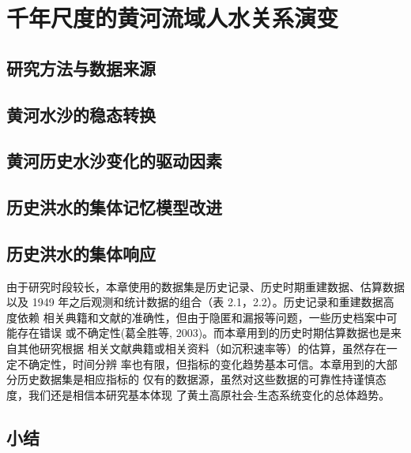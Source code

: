 \chapter{千年尺度的黄河流域人水关系演变}
\label{cha:3}


\section{研究方法与数据来源}
\label{ch3:methods}



\section{黄河水沙的稳态转换}

\section{黄河历史水沙变化的驱动因素}

\section{历史洪水的集体记忆模型改进}

\section{历史洪水的集体响应}

由于研究时段较长，本章使用的数据集是历史记录、历史时期重建数据、估算数据 以及 1949 年之后观测和统计数据的组合（表 2.1，2.2）。历史记录和重建数据高度依赖 相关典籍和文献的准确性，但由于隐匿和漏报等问题，一些历史档案中可能存在错误 或不确定性(葛全胜等, 2003)。而本章用到的历史时期估算数据也是来自其他研究根据 相关文献典籍或相关资料（如沉积速率等）的估算，虽然存在一定不确定性，时间分辨 率也有限，但指标的变化趋势基本可信。本章用到的大部分历史数据集是相应指标的 仅有的数据源，虽然对这些数据的可靠性持谨慎态度，我们还是相信本研究基本体现 了黄土高原社会-生态系统变化的总体趋势。

\section{小结}
